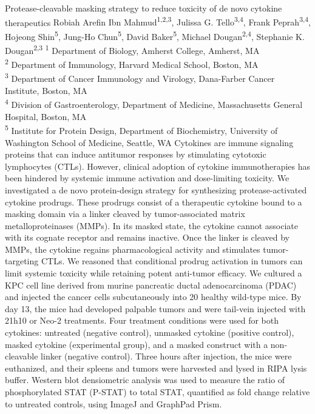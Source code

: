 {
\parskip=6pt    
\makeabstract
    {
    Protease-cleavable masking strategy to reduce toxicity of de novo cytokine therapeutics 
    }
    {
    Robiah Arefin Ibn Mahmud\textsuperscript{1,2,3}, Julissa G. Tello\textsuperscript{3,4}, Frank Peprah\textsuperscript{3,4}, Hojeong Shin\textsuperscript{5}, Jung-Ho Chun\textsuperscript{5}, David Baker\textsuperscript{5}, Michael Dougan\textsuperscript{2,4}, Stephanie K. Dougan\textsuperscript{2,3}
    }
    {
    \textsuperscript{1} Department of Biology, Amherst College, Amherst, MA\\
\textsuperscript{2} Department of Immunology, Harvard Medical School, Boston, MA\\
\textsuperscript{3} Department of Cancer Immunology and Virology, Dana-Farber Cancer Institute, Boston, MA\\
\textsuperscript{4} Division of Gastroenterology, Department of Medicine, Massachusetts General Hospital, Boston, MA\\
\textsuperscript{5} Institute for Protein Design, Department of Biochemistry, University of Washington School of Medicine, Seattle, WA
    }
    {
    Cytokines are immune signaling proteins that can induce antitumor responses by stimulating cytotoxic lymphocytes (CTLs). However, clinical adoption of cytokine immunotherapies has been hindered by systemic immune activation and dose-limiting toxicity. We investigated a de novo protein-design strategy for synthesizing protease-activated cytokine prodrugs. These prodrugs consist of a therapeutic cytokine bound to a masking domain via a linker cleaved by tumor-associated matrix metalloproteinases (MMPs). In its masked state, the cytokine cannot associate with its cognate receptor and remains inactive. Once the linker is cleaved by MMPs, the cytokine regains pharmacological activity and stimulates tumor-targeting CTLs. We reasoned that conditional prodrug activation in tumors can limit systemic toxicity while retaining potent anti-tumor efficacy.
    }
    {
    We cultured a KPC cell line derived from murine pancreatic ductal adenocarcinoma (PDAC) and injected the cancer cells subcutaneously into 20 healthy wild-type mice. By day 13, the mice had developed palpable tumors and were tail-vein injected with 21h10 or Neo-2 treatments. Four treatment conditions were used for both cytokines: untreated (negative control), unmasked cytokine (positive control), masked cytokine (experimental group), and a masked construct with a non-cleavable linker (negative control). Three hours after injection, the mice were euthanized, and their spleens and tumors were harvested and lysed in RIPA lysis buffer. Western blot densiometric analysis was used to measure the ratio of phosphorylated STAT (P-STAT) to total STAT, quantified as fold change relative to untreated controls, using ImageJ and GraphPad Prism.
}}
